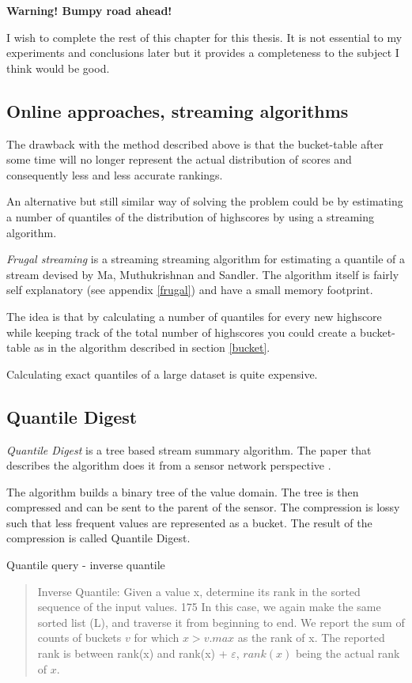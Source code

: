 \begin{mdframed}[backgroundcolor=red,innerleftmargin=15pt,leftmargin=-10pt,rightmargin=-10pt, innerrightmargin=15pt,innertopmargin=10pt,innerbottommargin=10pt, fontcolor=white, skipabove=20pt, linewidth=0]
  \textbf{Warning! Bumpy road ahead!}
  
  I wish to complete the rest of this chapter for this thesis. It is not essential to my experiments and conclusions later but it provides a completeness to the subject I think would be good.
\end{mdframed}

\subsection{Online approaches, streaming algorithms}

The drawback with the method described above is that the bucket-table after some time will no longer represent the actual distribution of scores and consequently less and less accurate rankings.

An alternative but still similar way of solving the problem could be by estimating a number of quantiles of the distribution of highscores by using a streaming algorithm. 

\emph{Frugal streaming} is a streaming streaming algorithm for estimating a quantile of a stream devised by Ma, Muthukrishnan and Sandler. \cite{frugal_streaming} The algorithm itself is fairly self explanatory (see appendix \ref{frugal}) and have a small memory footprint.

The idea is that by calculating a number of quantiles for every new highscore while keeping track of the total number of highscores you could create a bucket-table as in the algorithm described in section \ref{bucket}.

Calculating exact quantiles of a large dataset is quite expensive.

\subsection{Quantile Digest}

\emph{Quantile Digest} is a tree based stream summary algorithm. The paper that describes the algorithm does it from a sensor network perspective \cite{quantile_digest}.

The algorithm builds a binary tree of the value domain. The tree is then compressed and can be sent to the parent of the sensor. The compression is lossy such that less frequent values are represented as a bucket. The result of the compression is called Quantile Digest.

Quantile query - inverse quantile

\blockquote{

Inverse Quantile: Given a value x, determine its
rank in the sorted sequence of the input values.
175
In this case, we again make the same sorted list (L),
and traverse it from beginning to end. We report the
sum of counts of buckets $v$ for which $x > v.max$ as
the rank of x. The reported rank is between rank(x)
and rank(x) + $\varepsilon$, $rank(x)$ being the actual rank of
$x$.}
